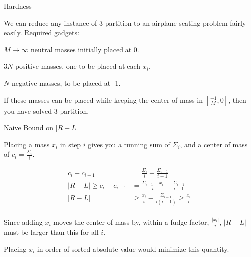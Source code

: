 \documentclass[compress,table]{beamer}
\newcommand{\posNode}{\node[circle,draw,fill=red!30,minimum width={width("1")},minimum height={height("1")}]}
\newcommand{\negNode}{\node[rectangle,draw,fill=blue!30,minimum width={width("1")},minimum height={height("1")}]}
\begin{document}
\begin{frame}[t]{Hardness}

We can reduce any instance of 3-partition to an airplane seating problem fairly easily.  Required gadgets:

$M \rightarrow \infty$ neutral masses {\color{gray} initially placed at 0}.

$3N$ positive masses, {\color{red!60} one to be placed at each $x_i$}.

$N$ negative masses, {\color{blue!60} to be placed at -1}.

\begin{figure}[ht!] \centering
\end{figure}

If these masses can be placed while keeping the center of mass in $[\frac{-1}{M},0]$, then you have solved 3-partition.

\end{frame}

\begin{frame}[t]{Naive Bound on $|R-L|$}

Placing a mass $x_i$ in step $i$ gives you a running sum of $\Sigma_i$, and a center of mass of $c_i = \frac{\Sigma_i}{i}$. 

\begin{align*}
c_i - c_{i-1} &= \frac{\Sigma_i}{i} - \frac{\Sigma_{i-1}}{i-1} \\
|R-L| \geq c_i - c_{i-1} &= \frac{\Sigma_{i-1} + x_i}{i} - \frac{\Sigma_{i-1}}{i-1} \\
|R-L| &\geq  \frac{x_i}{i} - \frac{\Sigma_{i-1}}{i(i-1)} \geq  \frac{x_i}{i} \\
\end{align*}

Since adding $x_i$ moves the center of mass by, within a fudge factor, $\frac{|x_i|}{i}$, $|R-L|$ must be larger than this for all $i$.

Placing $x_i$ in order of sorted absolute value would minimize this quantity.

\end{frame}
\end{document}
